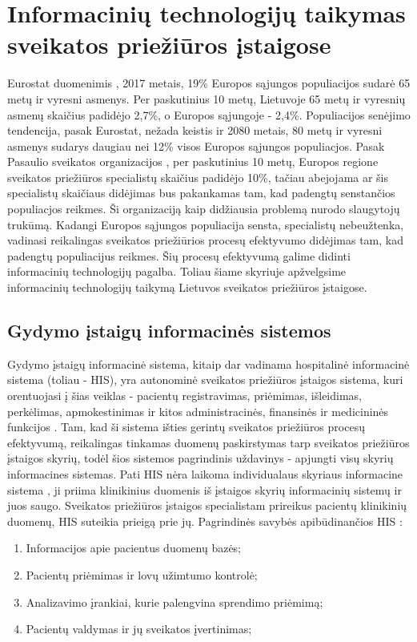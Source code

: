 \section{Informacinių technologijų taikymas sveikatos priežiūros įstaigose}
Eurostat duomenimis \cite{Eurostat}, 2017 metais, 19\% Europos sąjungos populiacijos sudarė 65 metų ir vyresni asmenys. Per paskutinius 10 metų, Lietuvoje 65 metų ir vyresnių asmenų skaičius padidėjo 2,7\%, o Europos sąjungoje - 2,4\%. Populiacijos senėjimo tendencija, pasak Eurostat, nežada keistis ir 2080 metais, 80 metų ir vyresni asmenys sudarys daugiau nei 12\% visos Europos sąjungos populiacjos. Pasak Pasaulio sveikatos organizacijos \cite{Organization2012}, per paskutinius 10 metų, Europos regione sveikatos priežiūros specialistų skaičius padidėjo 10\%, tačiau abejojama ar šis specialistų skaičiaus didėjimas bus pakankamas tam, kad padengtų senstančios populiacjos reikmes. Ši organizaciją kaip didžiausia problemą nurodo slaugytojų trukūmą. Kadangi Europos sąjungos populiacija sensta, specialistų nebeužtenka, vadinasi reikalingas sveikatos priežiūrios procesų efektyvumo didėjimas tam, kad padengtų populiacijus reikmes. Šių procesų efektyvumą galime didinti informacinių technologijų pagalba. Toliau šiame skyriuje apžvelgsime informacinių technologijų taikymą Lietuvos sveikatos priežiūros įstaigose.

\subsection{Gydymo įstaigų informacinės sistemos}
Gydymo įstaigų informacinė sistema, kitaip dar vadinama hospitalinė informacinė sistema (toliau - HIS), yra autonominė sveikatos priežiūros įstaigos sistema, kuri orentuojasi į šias veiklas - pacientų registravimas, priėmimas, išleidimas, perkėlimas, apmokestinimas ir kitos administracinės, finansinės ir medicininės funkcijos \cite{Sabooniha2012}. Tam, kad ši sistema išties gerintų sveikatos priežiūros procesų efektyvumą, reikalingas tinkamas duomenų paskirstymas tarp sveikatos priežiūros įstaigos skyrių, todėl šios sistemos pagrindinis uždavinys - apjungti visų skyrių informacines sistemas. Pati HIS nėra laikoma individualaus skyriaus informacine sistema \cite{JuliusGriskevicius}, ji priima klinikinius duomenis iš įstaigos skyrių informacinių sistemų ir juos saugo. Sveikatos priežiūros įstaigos specialistam prireikus pacientų klinikinių duomenų, HIS suteikia prieigą prie jų. Pagrindinės savybės apibūdinančios HIS \cite{JuliusGriskevicius}: 
\begin{enumerate}
    \item Informacijos apie pacientus duomenų bazės;
    \item Pacientų priėmimas ir lovų užimtumo kontrolė;
    \item Analizavimo įrankiai, kurie palengvina sprendimo priėmimą;
    \item Pacientų valdymas ir jų sveikatos įvertinimas;
\end{enumerate}



